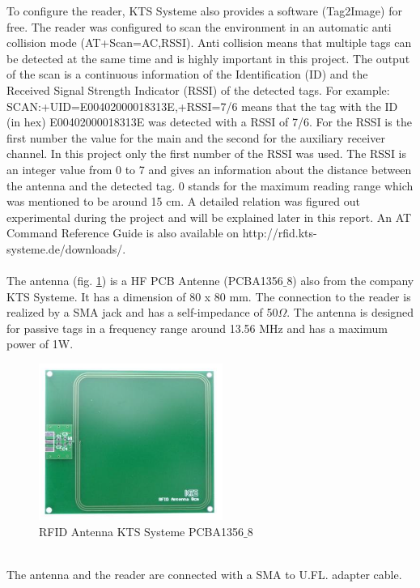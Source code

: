 To configure the reader, KTS Systeme also provides a software (Tag2Image) for free. The reader was configured to scan the environment in an automatic anti collision mode (AT+Scan=AC,RSSI). Anti collision means that multiple tags can be detected at the same time and is highly important in this project. The output of the scan is a continuous information of the Identification (ID) and the Received Signal Strength Indicator (RSSI) of the detected tags. For example: SCAN:+UID=E00402000018313E,+RSSI=7/6 means that the tag with the ID (in hex) E00402000018313E was detected with a RSSI of 7/6. For the RSSI is the first number the value for the main and the second for the auxiliary receiver channel. In this project only the first number of the RSSI was used. The RSSI is an integer value from 0 to 7 and gives an information about the distance between the antenna and the detected tag. 0 stands for the maximum reading range which was mentioned to be around 15 cm. A detailed relation was figured out experimental during the project and will be explained later in this report. An AT Command Reference Guide is also available on http://rfid.kts-systeme.de/downloads/.\\
\\
The antenna (fig. \ref{Antenna}) is a HF PCB Antenne (PCBA1356$\_$8) also from the company KTS Systeme. It has a dimension of 80 x 80 mm. The connection to the reader is realized by a SMA jack and has a self-impedance of 50$\Omega$. The antenna is designed for passive tags in a frequency range around 13.56 MHz and has a maximum power of 1W. \\
\begin{figure}[!htbp]
\centering
\includegraphics[width = 6cm]{Pictures/Antenna}
\caption{RFID Antenna KTS Systeme PCBA1356$\_$8}
\label{Antenna}
\end{figure}\\
The antenna and the reader are connected with a SMA to U.FL. adapter cable.\\

